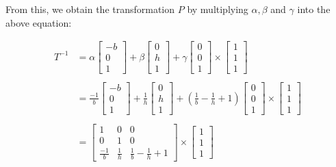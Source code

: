 \documentclass[12pt, oneside]{article}
\begin{document}
  From this, we obtain the transformation $P$ by multiplying $\alpha, \beta$ and 
  $\gamma$ into the above equation:
  
\begin{align*}
    T^{-1} &=
    \alpha \begin{bmatrix} -b   \\ 0   \\   1   \end{bmatrix} +
    \beta \begin{bmatrix} 0   \\ h   \\   1   \end{bmatrix} + 
    \gamma  \begin{bmatrix} 0  \\ 0 \\ 1  \end{bmatrix}  \times
    \begin{bmatrix} 1  \\ 1 \\ 1  \end{bmatrix}         \\ \\
    &=   \frac{-1}{b} \begin{bmatrix} -b   \\ 0   \\   1   \end{bmatrix} +
    \frac{1}{h} \begin{bmatrix} 0   \\ h   \\   1   \end{bmatrix} + 
    \left(\frac{1}{b} - \frac{1}{h} + 1 \right) 
    \begin{bmatrix} 0  \\ 0 \\ 1  \end{bmatrix}  \times
    \begin{bmatrix} 1  \\ 1 \\ 1  \end{bmatrix}  \\ \\
    &= \begin{bmatrix}
      1             &  0   & 0 \\
      0             &  1   & 0 \\
      \frac{-1}{b}  &  \frac{1}{h}  & \frac{1}{b} - \frac{1}{h} + 1
      \end{bmatrix} \times 
      \begin{bmatrix} 1 \\ 1 \\ 1  \end{bmatrix} \\
\end{align*} 
    
\end{document}
